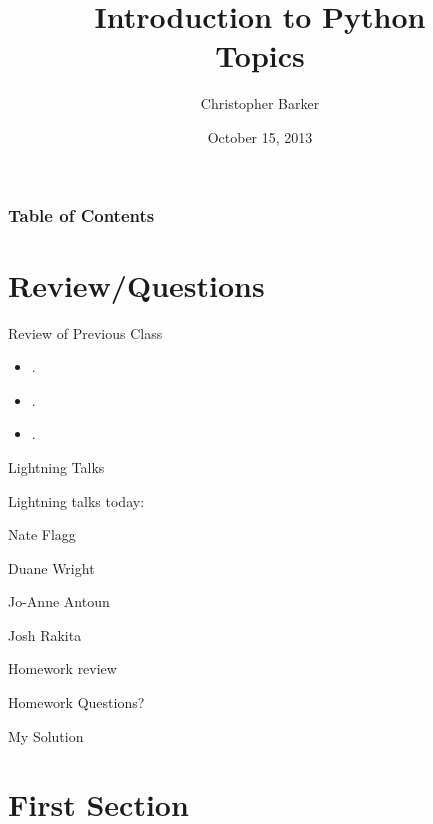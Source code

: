 \documentclass{beamer}
\title[Intro to Python: Week 3]{Introduction  to Python\\ Topics}
\author{Christopher Barker}
\institute{UW Continuing Education}
\date{October 15, 2013}
\begin{document}
\begin{frame}
  \titlepage
\end{frame}

\begin{frame}
\frametitle{Table of Contents}
  \tableofcontents
\end{frame}


\section{Review/Questions}

\begin{frame}{Review of Previous Class}

\begin{itemize}
  \item .
  \item .
  \item .
\end{itemize}

\end{frame}


\begin{frame}{Lightning Talks}

\vfill
{\LARGE Lightning talks today:}

\vfill
{\Large
Nate Flagg

\vfill
Duane Wright

\vfill
Jo-Anne Antoun 

\vfill
Josh Rakita

}
\vfill

\end{frame}


\begin{frame}{Homework review}

  \vfill
  {\Large Homework Questions? }

  \vfill
  {\Large My Solution}

  \vfill

\end{frame}

\section{First Section}
\end{document}
